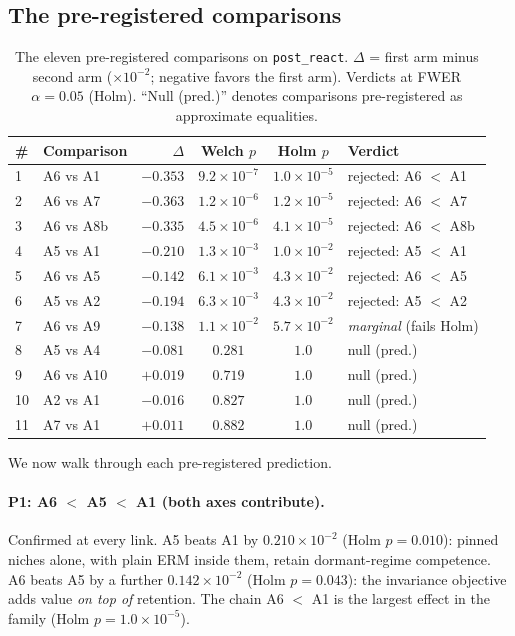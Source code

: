 \documentclass[11pt,a4paper]{article}
\theoremstyle{definition}
\theoremstyle{plain}
\begin{document}
\subsection{The pre-registered comparisons}
\label{sec:dd5-e1-tests}

\begin{table}[h]
\centering
\caption{The eleven pre-registered comparisons on \texttt{post\_react}.
$\Delta$ = first arm minus second arm ($\times 10^{-2}$; negative favors the
first arm). Verdicts at FWER $\alpha = 0.05$ (Holm). ``Null (pred.)''
denotes comparisons pre-registered as approximate equalities.}
\label{tab:dd5-e1-tests}
\small
\begin{tabular}{llrccl}
\toprule
\# & Comparison & $\Delta$ & Welch $p$ & Holm $p$ & Verdict \\
\midrule
1 & A6 vs A1  & $-0.353$ & $9.2\times 10^{-7}$ & $1.0\times 10^{-5}$ & rejected: A6 $<$ A1 \\
2 & A6 vs A7  & $-0.363$ & $1.2\times 10^{-6}$ & $1.2\times 10^{-5}$ & rejected: A6 $<$ A7 \\
3 & A6 vs A8b & $-0.335$ & $4.5\times 10^{-6}$ & $4.1\times 10^{-5}$ & rejected: A6 $<$ A8b \\
4 & A5 vs A1  & $-0.210$ & $1.3\times 10^{-3}$ & $1.0\times 10^{-2}$ & rejected: A5 $<$ A1 \\
5 & A6 vs A5  & $-0.142$ & $6.1\times 10^{-3}$ & $4.3\times 10^{-2}$ & rejected: A6 $<$ A5 \\
6 & A5 vs A2  & $-0.194$ & $6.3\times 10^{-3}$ & $4.3\times 10^{-2}$ & rejected: A5 $<$ A2 \\
7 & A6 vs A9  & $-0.138$ & $1.1\times 10^{-2}$ & $5.7\times 10^{-2}$ & \emph{marginal} (fails Holm) \\
8 & A5 vs A4  & $-0.081$ & $0.281$ & $1.0$ & null (pred.) \\
9 & A6 vs A10 & $+0.019$ & $0.719$ & $1.0$ & null (pred.) \\
10 & A2 vs A1 & $-0.016$ & $0.827$ & $1.0$ & null (pred.) \\
11 & A7 vs A1 & $+0.011$ & $0.882$ & $1.0$ & null (pred.) \\
\bottomrule
\end{tabular}
\end{table}

We now walk through each pre-registered prediction.

\paragraph{P1: A6 $<$ A5 $<$ A1 (both axes contribute).}
Confirmed at every link. A5 beats A1 by $0.210 \times 10^{-2}$
(Holm $p = 0.010$): pinned niches alone, with plain ERM inside them, retain
dormant-regime competence. A6 beats A5 by a further $0.142 \times 10^{-2}$
(Holm $p = 0.043$): the invariance objective adds value \emph{on top of}
retention. The chain A6 $<$ A1 is the largest effect in the family
(Holm $p = 1.0 \times 10^{-5}$).
\end{document}
